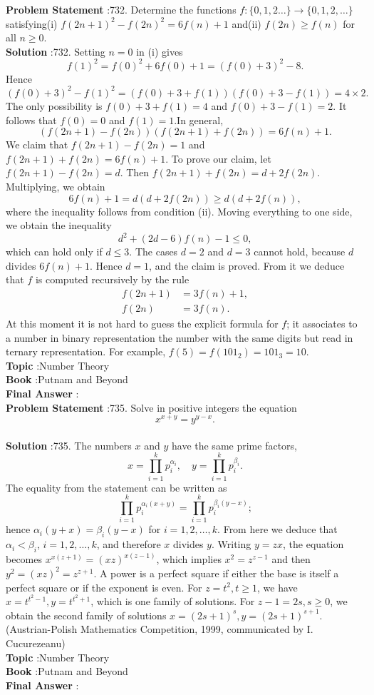 \documentclass[10pt]{article}
\begin{document}
\textbf{Problem Statement} :732. Determine the functions $f:\{0,1,2 \ldots\} \rightarrow\{0,1,2, \ldots\}$ satisfying(i) $f(2 n+1)^{2}-f(2 n)^{2}=6 f(n)+1$ and(ii) $f(2 n) \geq f(n)$ for all $n \geq 0$.\\
\textbf{Solution} :732. Setting $n=0$ in (i) gives$$ f(1)^{2}=f(0)^{2}+6 f(0)+1=(f(0)+3)^{2}-8 . $$Hence$$ (f(0)+3)^{2}-f(1)^{2}=(f(0)+3+f(1))(f(0)+3-f(1))=4 \times 2 . $$The only possibility is $f(0)+3+f(1)=4$ and $f(0)+3-f(1)=2$. It follows that $f(0)=0$ and $f(1)=1$.In general,$$ (f(2 n+1)-f(2 n))(f(2 n+1)+f(2 n))=6 f(n)+1 . $$We claim that $f(2 n+1)-f(2 n)=1$ and $f(2 n+1)+f(2 n)=6 f(n)+1$. To prove our claim, let $f(2 n+1)-f(2 n)=d$. Then $f(2 n+1)+f(2 n)=d+2 f(2 n)$. Multiplying, we obtain$$ 6 f(n)+1=d(d+2 f(2 n)) \geq d(d+2 f(n)), $$where the inequality follows from condition (ii). Moving everything to one side, we obtain the inequality$$ d^{2}+(2 d-6) f(n)-1 \leq 0, $$which can hold only if $d \leq 3$. The cases $d=2$ and $d=3$ cannot hold, because $d$ divides $6 f(n)+1$. Hence $d=1$, and the claim is proved. From it we deduce that $f$ is computed recursively by the rule $$ \begin{aligned} f(2 n+1) &=3 f(n)+1, \\ f(2 n) &=3 f(n) . \end{aligned} $$At this moment it is not hard to guess the explicit formula for $f$; it associates to a number in binary representation the number with the same digits but read in ternary representation. For example, $f(5)=f\left(101_{2}\right)=101_{3}=10$.\\
\textbf{Topic} :Number Theory\\
\textbf{Book} :Putnam and Beyond\\
\textbf{Final Answer} :\\


\textbf{Problem Statement} :735. Solve in positive integers the equation$$ x^{x+y}=y^{y-x} . $$\\
\textbf{Solution} :735. The numbers $x$ and $y$ have the same prime factors,$$ x=\prod_{i=1}^{k} p_{i}^{\alpha_{i}}, \quad y=\prod_{i=1}^{k} p_{i}^{\beta_{i}} . $$The equality from the statement can be written as$$ \prod_{i=1}^{k} p_{i}^{\alpha_{i}(x+y)}=\prod_{i=1}^{k} p_{i}^{\beta_{i}(y-x)} ; $$hence $\alpha_{i}(y+x)=\beta_{i}(y-x)$ for $i=1,2, \ldots, k$. From here we deduce that $\alpha_{i}<\beta_{i}$, $i=1,2, \ldots, k$, and therefore $x$ divides $y$. Writing $y=z x$, the equation becomes $x^{x(z+1)}=(x z)^{x(z-1)}$, which implies $x^{2}=z^{z-1}$ and then $y^{2}=(x z)^{2}=z^{z+1}$. A power is a perfect square if either the base is itself a perfect square or if the exponent is even. For $z=t^{2}, t \geq 1$, we have $x=t^{t^{2}-1}, y=t^{t^{2}+1}$, which is one family of solutions. For $z-1=2 s, s \geq 0$, we obtain the second family of solutions $x=(2 s+1)^{s}, y=(2 s+1)^{s+1}$.(Austrian-Polish Mathematics Competition, 1999, communicated by I. Cucurezeanu)\\
\textbf{Topic} :Number Theory\\
\textbf{Book} :Putnam and Beyond\\
\textbf{Final Answer} :\\
\end{document}
